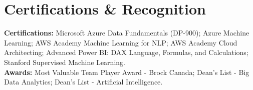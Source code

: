 \documentclass[10.5pt,letterpaper]{article}
\begin{document}
\section{Certifications \& Recognition}
\noindent\textbf{Certifications:} Microsoft Azure Data Fundamentals (DP-900); Azure Machine Learning; AWS Academy Machine Learning for NLP; AWS Academy Cloud Architecting; Advanced Power BI: DAX Language, Formulas, and Calculations; Stanford Supervised Machine Learning.\\
\noindent\textbf{Awards:} Most Valuable Team Player Award - Brock Canada; Dean's List - Big Data Analytics; Dean's List - Artificial Intelligence.
\end{document}
